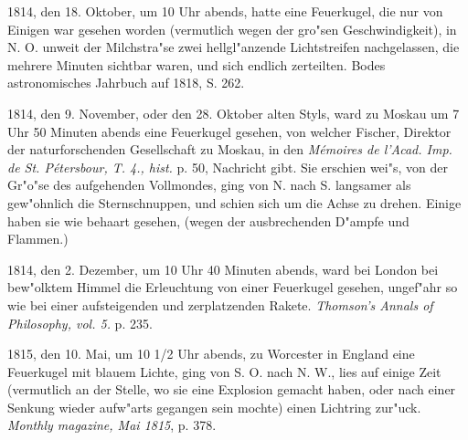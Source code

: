 \documentclass[a4paper, 11pt, oneside, polutonikogreek, german]{article}
\begin{document}
1814, den 18. Oktober, um 10 Uhr abends, hatte eine Feuerkugel, die nur von Einigen war gesehen worden (vermutlich wegen der gro"sen Geschwindigkeit), in N. O. unweit der Milchstra"se zwei hellgl"anzende Lichtstreifen nachgelassen, die mehrere Minuten sichtbar waren, und sich endlich zerteilten. Bodes astronomisches Jahrbuch auf 1818, S. 262.

1814, den 9. November, oder den 28. Oktober alten Styls, ward zu Moskau um 7 Uhr 50 Minuten abends eine Feuerkugel gesehen, von welcher Fischer, Direktor der naturforschenden Gesellschaft zu Moskau, in den \emph{Mémoires de l'Acad. Imp. de St. Pétersbour, T. 4., hist.} p. 50, Nachricht gibt. Sie erschien wei"s, von der Gr"o"se des aufgehenden Vollmondes, ging von N. nach S. langsamer als gew"ohnlich die Sternschnuppen, und schien sich um die Achse zu drehen. Einige haben sie wie behaart gesehen, (wegen der ausbrechenden D"ampfe und Flammen.)

1814, den 2. Dezember, um 10 Uhr 40 Minuten abends, ward bei London bei bew"olktem Himmel die Erleuchtung von einer Feuerkugel gesehen, ungef"ahr so wie bei einer aufsteigenden und zerplatzenden Rakete. \emph{Thomson's Annals of Philosophy, vol. 5.} p. 235.

1815, den 10. Mai, um 10 1/2 Uhr abends, zu Worcester in England eine Feuerkugel mit blauem Lichte, ging von S. O. nach N. W., lies auf einige Zeit (vermutlich an der Stelle, wo sie eine Explosion gemacht haben, oder nach einer Senkung wieder aufw"arts gegangen sein mochte) einen Lichtring zur"uck. \emph{Monthly magazine, Mai 1815}, p. 378.
\end{document}
